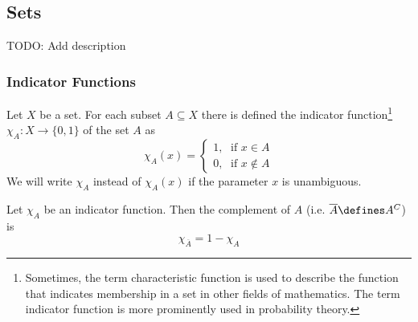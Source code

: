 \subsection{Sets}\label{subsec-sets}


TODO: Add description

\subsubsection{Indicator Functions}\label{subsubsec-indicator-functions}

\begin{definition}\label{def-indicator-function}
	Let $X$ be a set. For each subset $A \subseteq X$ there is defined the
	indicator function\footnote{Sometimes, the term characteristic function is
		used to describe the function that indicates membership in a set in other
		fields of mathematics. The term indicator function is more prominently used
		in probability theory.} $\chi_A:X\rightarrow \{0,1\}$ of the set $A$ as
	\begin{equation}
		\chi_A(x) = \begin{cases}
			1,\;\text{ if } x \in A \\
			0,\;\text{ if } x \notin A
		\end{cases}
	\end{equation}
	We will write $\chi_A$ instead of $\chi_A(x)$ if the parameter
	$x$ is unambiguous.
\end{definition}

\begin{thm}\label{thm-complement-indicator-function}
	Let $\chi_A$ be an indicator function. Then the complement of $A$ (i.e.
	$\overline{A} \defines A^C$) is
	\begin{equation*}
		\chi_{\overline{A}} = 1 - \chi_A
	\end{equation*}
\end{thm}

